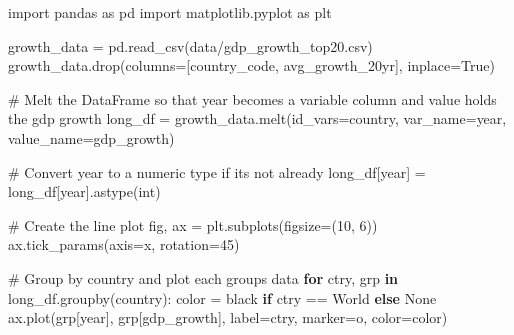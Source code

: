 \documentclass[
  letterpaper,
  DIV=11,
  numbers=noendperiod]{scrartcl}
\newenvironment{Shaded}{\begin{snugshade}}{\end{snugshade}}
\newcommand{\BuiltInTok}[1]{\textcolor[rgb]{0.00,0.23,0.31}{#1}}
\newcommand{\CommentTok}[1]{\textcolor[rgb]{0.37,0.37,0.37}{#1}}
\newcommand{\ControlFlowTok}[1]{\textcolor[rgb]{0.00,0.23,0.31}{\textbf{#1}}}
\newcommand{\DecValTok}[1]{\textcolor[rgb]{0.68,0.00,0.00}{#1}}
\newcommand{\ImportTok}[1]{\textcolor[rgb]{0.00,0.46,0.62}{#1}}
\newcommand{\KeywordTok}[1]{\textcolor[rgb]{0.00,0.23,0.31}{\textbf{#1}}}
\newcommand{\NormalTok}[1]{\textcolor[rgb]{0.00,0.23,0.31}{#1}}
\newcommand{\OperatorTok}[1]{\textcolor[rgb]{0.37,0.37,0.37}{#1}}
\newcommand{\StringTok}[1]{\textcolor[rgb]{0.13,0.47,0.30}{#1}}
\newcommand{\VariableTok}[1]{\textcolor[rgb]{0.07,0.07,0.07}{#1}}
\begin{document}
\begin{Shaded}
\begin{Highlighting}[]
\ImportTok{import}\NormalTok{ pandas }\ImportTok{as}\NormalTok{ pd}
\ImportTok{import}\NormalTok{ matplotlib.pyplot }\ImportTok{as}\NormalTok{ plt}

\NormalTok{growth\_data }\OperatorTok{=}\NormalTok{ pd.read\_csv(}\StringTok{\textquotesingle{}data/gdp\_growth\_top20.csv\textquotesingle{}}\NormalTok{)}
\NormalTok{growth\_data.drop(columns}\OperatorTok{=}\NormalTok{[}\StringTok{\textquotesingle{}country\_code\textquotesingle{}}\NormalTok{, }\StringTok{\textquotesingle{}avg\_growth\_20yr\textquotesingle{}}\NormalTok{], inplace}\OperatorTok{=}\VariableTok{True}\NormalTok{)}

\CommentTok{\# Melt the DataFrame so that \textquotesingle{}year\textquotesingle{} becomes a variable column and \textquotesingle{}value\textquotesingle{} holds the gdp growth}
\NormalTok{long\_df }\OperatorTok{=}\NormalTok{ growth\_data.melt(id\_vars}\OperatorTok{=}\StringTok{\textquotesingle{}country\textquotesingle{}}\NormalTok{, var\_name}\OperatorTok{=}\StringTok{\textquotesingle{}year\textquotesingle{}}\NormalTok{, value\_name}\OperatorTok{=}\StringTok{\textquotesingle{}gdp\_growth\textquotesingle{}}\NormalTok{)}

\CommentTok{\# Convert \textquotesingle{}year\textquotesingle{} to a numeric type if it\textquotesingle{}s not already}
\NormalTok{long\_df[}\StringTok{\textquotesingle{}year\textquotesingle{}}\NormalTok{] }\OperatorTok{=}\NormalTok{ long\_df[}\StringTok{\textquotesingle{}year\textquotesingle{}}\NormalTok{].astype(}\BuiltInTok{int}\NormalTok{)}

\CommentTok{\# Create the line plot}
\NormalTok{fig, ax }\OperatorTok{=}\NormalTok{ plt.subplots(figsize}\OperatorTok{=}\NormalTok{(}\DecValTok{10}\NormalTok{, }\DecValTok{6}\NormalTok{))}
\NormalTok{ax.tick\_params(axis}\OperatorTok{=}\StringTok{\textquotesingle{}x\textquotesingle{}}\NormalTok{, rotation}\OperatorTok{=}\DecValTok{45}\NormalTok{)}

\CommentTok{\# Group by country and plot each group\textquotesingle{}s data}
\ControlFlowTok{for}\NormalTok{ ctry, grp }\KeywordTok{in}\NormalTok{ long\_df.groupby(}\StringTok{\textquotesingle{}country\textquotesingle{}}\NormalTok{):}
\NormalTok{    color }\OperatorTok{=} \StringTok{\textquotesingle{}black\textquotesingle{}} \ControlFlowTok{if}\NormalTok{ ctry }\OperatorTok{==} \StringTok{\textquotesingle{}World\textquotesingle{}} \ControlFlowTok{else} \VariableTok{None}
\NormalTok{    ax.plot(grp[}\StringTok{\textquotesingle{}year\textquotesingle{}}\NormalTok{], grp[}\StringTok{\textquotesingle{}gdp\_growth\textquotesingle{}}\NormalTok{], label}\OperatorTok{=}\NormalTok{ctry, marker}\OperatorTok{=}\StringTok{\textquotesingle{}o\textquotesingle{}}\NormalTok{, color}\OperatorTok{=}\NormalTok{color)}


\end{Highlighting}
\end{Shaded}
\end{document}
